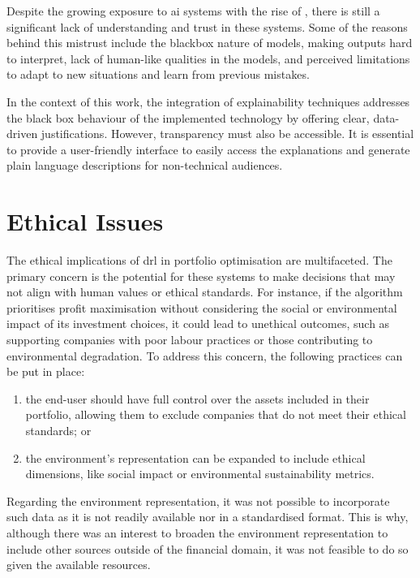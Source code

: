 Despite the growing exposure to \acrfull{ai} systems with the rise of , there is still a significant lack of understanding and trust in these systems. Some of the reasons behind this mistrust include the \gls{blackbox} nature of models, making outputs hard to interpret, lack of human-like qualities in the models, and perceived limitations to adapt to new situations and learn from previous mistakes.

In the context of this work, the integration of explainability techniques addresses the black box behaviour of the implemented technology by offering clear, data-driven justifications. However, transparency must also be accessible. It is essential to provide a user-friendly interface to easily access the explanations and generate plain language descriptions for non-technical audiences.

\section{Ethical Issues} \label{sec:ethical-issues}

The ethical implications of \acrshort{drl} in portfolio optimisation are multifaceted. The primary concern is the potential for these systems to make decisions that may not align with human values or ethical standards. For instance, if the algorithm prioritises profit maximisation without considering the social or environmental impact of its investment choices, it could lead to unethical outcomes, such as supporting companies with poor labour practices or those contributing to environmental degradation. To address this concern, the following practices can be put in place:
\begin{enumerate}
    \item the end-user should have full control over the assets included in their portfolio, allowing them to exclude companies that do not meet their ethical standards; or
    \item the environment's representation can be expanded to include ethical dimensions, like social impact or environmental sustainability metrics.
\end{enumerate}

Regarding the environment representation, it was not possible to incorporate such data as it is not readily available nor in a standardised format. This is why, although there was an interest to broaden the environment representation to include other sources outside of the financial domain, it was not feasible to do so given the available resources.


